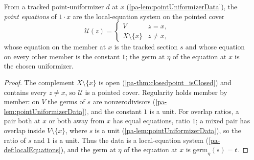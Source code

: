 \begin{definition}
  \label{pa-def:pointEquations}
  \leanok

  From a tracked point-uniformizer \(d\) at \(x\) (\ref{pa-lem:pointUniformizerData}), the
  \emph{point equations} of \(1 \cdot x\) are the local-equation system on the pointed cover
  \[
    \mathcal U(z) = \begin{cases} V & z = x, \\ X \setminus \{x\} & z \neq x, \end{cases}
  \]
  whose equation on the member at \(x\) is the tracked section \(s\) and whose equation on every
  other member is the constant \(1\); the germ at \(\eta\) of the equation at \(x\) is the chosen
  uniformizer.
\end{definition}
\begin{proof}
  \leanok
  The complement \(X \setminus \{x\}\) is open (\ref{pa-thm:closedpoint_isClosed}) and contains every
  \(z \neq x\), so \(\mathcal U\) is a pointed cover. Regularity holds member by member: on \(V\)
  the germs of \(s\) are nonzerodivisors (\ref{pa-lem:pointUniformizerData}), and the constant \(1\)
  is a unit. For overlap ratios, a pair both at \(x\) or both away from \(x\) has equal equations,
  ratio \(1\); a mixed pair has overlap inside \(V \setminus \{x\}\), where \(s\) is a unit
  (\ref{pa-lem:pointUniformizerData}), so the ratio of \(s\) and \(1\) is a unit. Thus the data is a
  local-equation system (\ref{pa-def:localEquations}), and the germ at \(\eta\) of the equation at
  \(x\) is \(\mathrm{germ}_\eta(s) = t\).
\end{proof}

